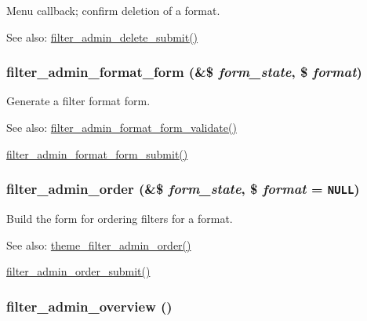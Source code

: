 Menu callback; confirm deletion of a format.

\begin{Desc}
\item[See also:]\hyperlink{filter_8admin_8inc_280611f74f59bc785a6fd35fae0ed8d3}{filter\_\-admin\_\-delete\_\-submit()} \end{Desc}
\hypertarget{group__forms_gfa40bd6f3659ac2e8980f5b30d263ab2}{
\subsubsection[{filter\_\-admin\_\-format\_\-form}]{\setlength{\rightskip}{0pt plus 5cm}filter\_\-admin\_\-format\_\-form (\&\$ {\em form\_\-state}, \/  \$ {\em format})}}
\label{group__forms_gfa40bd6f3659ac2e8980f5b30d263ab2}


Generate a filter format form.

\begin{Desc}
\item[See also:]\hyperlink{filter_8admin_8inc_1ae5e99340abc69aadeff9d2a538d578}{filter\_\-admin\_\-format\_\-form\_\-validate()} 

\hyperlink{filter_8admin_8inc_1cabbcac9ccc4de52ea16a64a8c8cd54}{filter\_\-admin\_\-format\_\-form\_\-submit()} \end{Desc}
\hypertarget{group__forms_g6f9ec0dfed0e7f095f0f99f731d084be}{
\subsubsection[{filter\_\-admin\_\-order}]{\setlength{\rightskip}{0pt plus 5cm}filter\_\-admin\_\-order (\&\$ {\em form\_\-state}, \/  \$ {\em format} = {\tt NULL})}}
\label{group__forms_g6f9ec0dfed0e7f095f0f99f731d084be}


Build the form for ordering filters for a format.

\begin{Desc}
\item[See also:]\hyperlink{group__themeable_g2043f70c09f1b97fed7917c783bb774c}{theme\_\-filter\_\-admin\_\-order()} 

\hyperlink{filter_8admin_8inc_b784a456f8aaeddc16e19018b80042b0}{filter\_\-admin\_\-order\_\-submit()} \end{Desc}
\hypertarget{group__forms_gfef1e200ed76ee122718a52cf9abb0f2}{
\subsubsection[{filter\_\-admin\_\-overview}]{\setlength{\rightskip}{0pt plus 5cm}filter\_\-admin\_\-overview ()}}
\label{group__forms_gfef1e200ed76ee122718a52cf9abb0f2}


